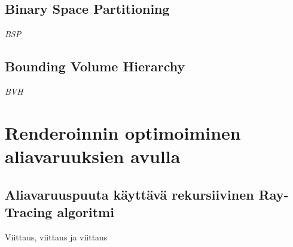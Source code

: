 \documentclass[a4paper,12pt, titlepage]{article}
\theoremstyle{break}
\theoremstyle{algostyle}
\begin{document}
\subsection{Binary Space Partitioning}
\textit{BSP}
\subsection{Bounding Volume Hierarchy}
\textit{BVH}

\section{Renderoinnin optimoiminen aliavaruuksien avulla}
\subsection{Aliavaruuspuuta käyttävä rekursiivinen Ray-Tracing algoritmi}
Viittaus\cite{ranta}, viittaus\cite{lengyel} ja viittaus\cite{janke}\cite{rules}\cite{fuchs}
\cite{haines}\cite{sherrod}



\end{document}
